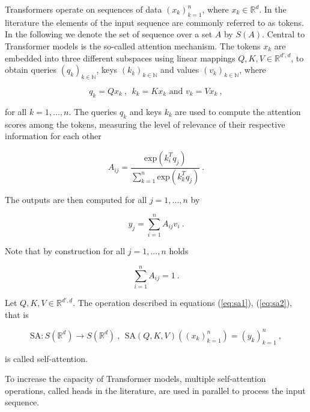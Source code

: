 Transformers operate on sequences of data $(x_{k})_{k=1}^n$, where $x_{k} \in \mathbb R^d$.
In the literature the elements of the input sequence are commonly referred to as tokens.
In the following we denote the set of sequence over a set $A$ by $S(A)$.
Central to Transformer models is the so-called attention mechanism.
The tokens $x_k$ are embedded into three different subspaces using linear mappings $Q, K, V \in \mathbb R^{d', d}$,
to obtain queries $(q_k)_{k \in \mathbb N}$, keys $(k_k)_{k \in \mathbb N}$ and values $(v_k)_{k \in \mathbb N}$,
where

    \begin{equation*}
        q_k = Q x_k ~, ~~ k_k = K x_k \text{ and } v_k = V x_k ~,
    \end{equation*}

for all $k = 1, ..., n$.
The queries $q_k$ and keys $k_k$ are used to compute the attention scores among the tokens,
measuring the level of relevance of their respective information for each other

    \begin{equation} \label{eq:sa1}
        A_{ij} = \frac{\text{exp}(k_{i}^T q_{j})}{\sum_{k = 1}^n \text{exp}(k_{k}^T q_{j})} ~.
    \end{equation}

The outputs are then computed for all $j=1, ..., n$ by 

    \begin{equation} \label{eq:sa2}
        y_{j} = \sum_{i=1}^n A_{ij} v_{i} ~.
    \end{equation}

Note that by construction for all $j = 1,..., n$ holds

    $$ \sum_{i=1}^n A_{ij} = 1 ~. $$

\begin{definition}
    \label{def:sa}
    Let $Q, K, V \in \mathbb R^{d', d}$.
    The operation described in equations (\ref{eq:sa1}), (\ref{eq:sa2}), that is

        $$ \text{SA}: S(\mathbb R^{d}) \to S(\mathbb R^{d}) ~, ~~ \text{SA} (Q, K, V) \left( (x_{k})_{k=1}^n \right) = (y_{k})_{k=1}^n ~, $$

    is called self-attention.
\end{definition}

To increase the capacity of Transformer models, multiple self-attention operations, 
called heads in the literature, are used in parallel to process the input sequence.

